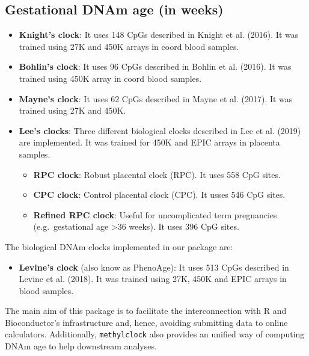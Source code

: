 \documentclass[]{article}
\providecommand{\tightlist}{%
  \setlength{\itemsep}{0pt}\setlength{\parskip}{0pt}}
\begin{document}
\hypertarget{gestational-dnam-age-in-weeks}{%
\subsection{Gestational DNAm age (in weeks)}\label{gestational-dnam-age-in-weeks}}

\begin{itemize}
\tightlist
\item
  \textbf{Knight's clock}: It uses 148 CpGs described in Knight et al. (2016). It was trained using 27K and 450K arrays in coord blood samples.
\item
  \textbf{Bohlin's clock}: It uses 96 CpGs described in Bohlin et al. (2016). It was trained using 450K array in coord blood samples.
\item
  \textbf{Mayne's clock}: It uses 62 CpGs described in Mayne et al. (2017). It was trained using 27K and 450K.
\item
  \textbf{Lee's clocks}: Three different biological clocks described in Lee et al. (2019) are implemented. It was trained for 450K and EPIC arrays in placenta samples.

  \begin{itemize}
  \tightlist
  \item
    \textbf{RPC clock}: Robust placental clock (RPC). It uses 558 CpG sites.
  \item
    \textbf{CPC clock}: Control placental clock (CPC). It usses 546 CpG sites.
  \item
    \textbf{Refined RPC clock}: Useful for uncomplicated term pregnancies (e.g.~gestational age \textgreater{}36 weeks). It uses 396 CpG sites.
  \end{itemize}
\end{itemize}

The biological DNAm clocks implemented in our package are:

\begin{itemize}
\tightlist
\item
  \textbf{Levine's clock} (also know as PhenoAge): It uses 513 CpGs described in Levine et al. (2018). It was trained using 27K, 450K and EPIC arrays in blood samples.
\end{itemize}

The main aim of this package is to facilitate the interconnection with R and Bioconductor's infrastructure and, hence, avoiding submitting data to online calculators. Additionally, \texttt{methylclock} also provides an unified way of computing DNAm age to help downstream analyses.
\end{document}
